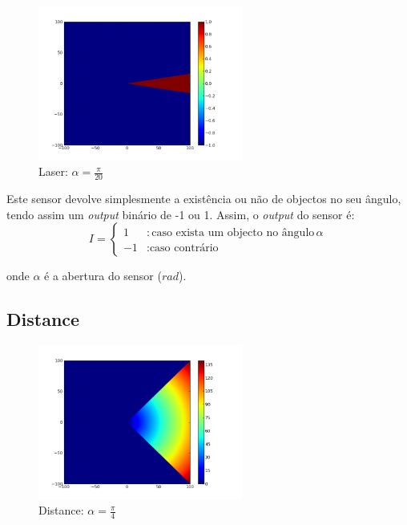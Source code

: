 \documentclass[a4paper]{article}
\begin{document}
\begin{figure}[h]
	\vspace{-20pt}
	\begin{center}
		\includegraphics[width=0.6\textwidth]{graphs/sensors/laser.png}
	\end{center}
	\vspace{-20pt}
	\caption{Laser: $\alpha=\frac{\pi}{20}$}
\end{figure}

\indent Este sensor devolve simplesmente a existência ou não de objectos no seu ângulo, tendo assim um \emph{output} binário de -1 ou 1.
Assim, o \emph{output} do sensor é:
\[
	I = \left\{
		\begin{array}{lr}
			1 & : \text{caso exista um objecto no ângulo}\, \alpha \\
			-1 & : \text{caso contrário}
		\end{array}
		\right.
\]

onde $\alpha$ é a abertura do sensor ($rad$).


\cleardoublepage
\subsection{Distance}

\begin{figure}[h]
	\vspace{-20pt}
	\begin{center}
		\includegraphics[width=0.6\textwidth]{graphs/sensors/distance.png}
	\end{center}
	\vspace{-20pt}
	\caption{Distance: $\alpha=\frac{\pi}{4}$}
\end{figure}
\end{document}

